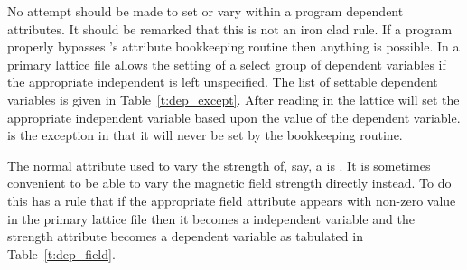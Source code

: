 No attempt should be made to set or vary within a program dependent
attributes. It should be remarked that this is not an iron clad rule.
If a program properly bypasses \bmad's attribute bookkeeping routine
then anything is possible. In a primary lattice file \bmad allows the
setting of a select group of dependent variables if the appropriate
independent is left unspecified.  The list of settable dependent
variables is given in Table~\ref{t:dep_except}.  After reading in the
lattice \bmad will set the appropriate independent variable based
upon the value of the dependent variable.  is the exception in 
that it will never be set by the bookkeeping routine.
\begin{table}[h]
\caption {Dependent variables that can be set in a primary lattice file.}
\label{t:dep_except}
\end{table}

The normal attribute used to vary the strength of, say, a
 is .  It is sometimes convenient to be able to
vary the magnetic field strength directly instead. To do this \bmad has
a rule that if the appropriate field attribute appears with non-zero value in the
primary lattice file then it becomes a independent variable and the strength attribute
becomes a dependent variable as tabulated in Table~\ref{t:dep_field}.
\begin{table}[h]
\caption {Field and Strength Attributes.}
\label{t:dep_field}
\end{table}

